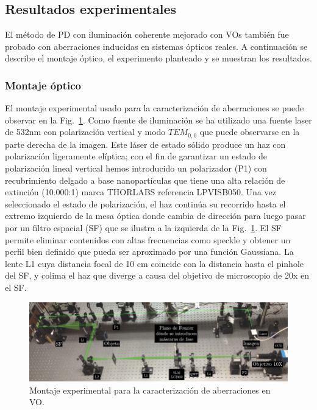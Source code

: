 \subsection{Resultados experimentales}
\label{sec:ChPD_resultados_experimentales}

El método de PD con iluminación coherente mejorado con VOs también fue
probado con aberraciones inducidas en sistemas ópticos reales. A
continuación se describe el montaje óptico, el experimento planteado y
se muestran los resultados. 

\subsubsection{Montaje óptico} 
\label{sec:montaje_PD}
El montaje experimental usado para la caracterización de aberraciones
se puede observar en la Fig.~\ref{fig:exp_setup}. Como fuente de
iluminación se ha utilizado una fuente laser de 532nm con polarización
vertical y modo $TEM_{0,0}$ que puede observarse en la parte derecha de la imagen. Este
láser de estado sólido produce un haz con polarización ligeramente
elíptica; con el fin de garantizar un estado de polarización lineal
vertical hemos introducido un polarizador (P1) con recubrimiento delgado a
base nanopartículas que tiene una alta relación de
extinción (10.000:1) marca THORLABS referencia LPVISB050. Una vez
seleccionado el estado de polarización, el haz continúa su recorrido 
hasta el extremo izquierdo de la mesa óptica donde cambia de dirección
para luego pasar por un filtro espacial (\acrshort{SF}) que se ilustra a la izquierda
de la Fig.~\ref{fig:exp_setup}. El SF permite eliminar
contenidos con altas frecuencias como speckle y obtener un perfil
 bien definido que pueda ser aproximado por una función Gaussiana. La
 lente L1 cuya distancia focal de 10 cm coincide con la distancia hasta
 el pinhole del SF, y colima el haz que diverge a causa del
 objetivo de microscopio de 20x en el SF. 

\begin{figure}[h!]
\centering
\includegraphics[scale=1]{PD_setup_big.pdf}
\caption[Montaje experimental para reconstrucción de fase con PD]{Montaje experimental para la caracterización de aberraciones
en VO.} 
\label{fig:exp_setup}
\end{figure} 

